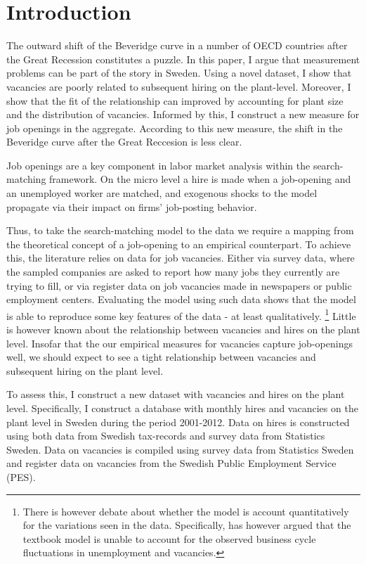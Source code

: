 
\section{Introduction}

The outward shift of the Beveridge curve in a number of OECD countries after the Great Recession constitutes a puzzle. In this paper, I argue that measurement problems can be part of the story in Sweden. Using a novel dataset, I show that vacancies are poorly related to subsequent hiring on the plant-level. Moreover, I show that the fit of the relationship can improved by accounting for plant size and the distribution of vacancies. Informed by this, I construct a new measure for job openings in the aggregate. According to this new measure, the shift in the Beveridge curve after the Great Reccesion is less clear. 

Job openings are a key component in labor market analysis within the search-matching framework. On the micro level a hire is made when a job-opening and an unemployed worker are matched, and exogenous shocks to the model propagate via their impact on firms' job-posting behavior.

Thus, to take the search-matching model to the data we require a mapping from the theoretical concept of a job-opening to an empirical counterpart. To achieve this, the literature relies on data for job vacancies. Either via survey data, where the sampled companies are asked to report how many jobs they currently are trying to fill, or via register data on job vacancies made in newspapers or public employment centers. Evaluating the model using such data shows that the model is able to reproduce some key features of the data - at least qualitatively. \footnote{There is however debate about whether the model is account quantitatively for the variations seen in the data. Specifically,\cite{Shimer2005} has however argued that the textbook model is unable to account for the observed business cycle fluctuations in unemployment and vacancies.} Little is however known about the relationship between vacancies and hires on the plant level. Insofar that the our empirical measures for vacancies capture job-openings well, we should expect to see a tight relationship between vacancies and subsequent hiring on the plant level. 

To assess this, I construct a new dataset with vacancies and hires on the plant level. Specifically, I construct a database with monthly hires and vacancies on the plant level in Sweden during the period 2001-2012. Data on hires is constructed using both data from Swedish tax-records and survey data from Statistics Sweden. Data on vacancies is compiled using survey data from Statistics Sweden and register data on vacancies from the Swedish Public Employment Service (PES). 

